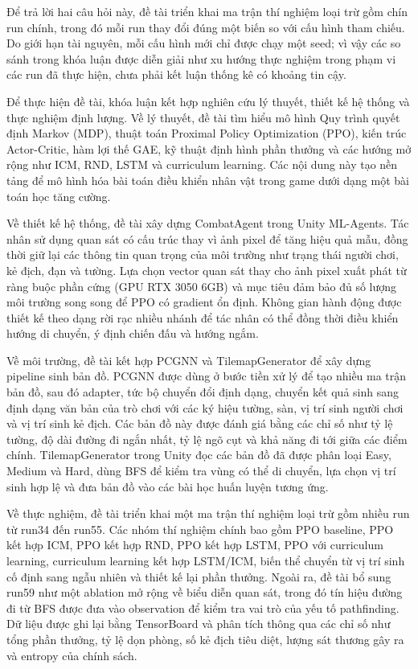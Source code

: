 Để trả lời hai câu hỏi này, đề tài triển khai ma trận thí nghiệm loại trừ gồm chín run chính, trong đó mỗi run thay đổi đúng một biến so với cấu hình tham chiếu. Do giới hạn tài nguyên, mỗi cấu hình mới chỉ được chạy một seed; vì vậy các so sánh trong khóa luận được diễn giải như xu hướng thực nghiệm trong phạm vi các run đã thực hiện, chưa phải kết luận thống kê có khoảng tin cậy.

\vspace{0.5cm}


Để thực hiện đề tài, khóa luận kết hợp nghiên cứu lý thuyết, thiết kế hệ thống và thực nghiệm định lượng. Về lý thuyết, đề tài tìm hiểu mô hình Quy trình quyết định Markov (MDP), thuật toán Proximal Policy Optimization (PPO), kiến trúc Actor-Critic, hàm lợi thế GAE, kỹ thuật định hình phần thưởng và các hướng mở rộng như ICM, RND, LSTM và curriculum learning. Các nội dung này tạo nền tảng để mô hình hóa bài toán điều khiển nhân vật trong game dưới dạng một bài toán học tăng cường.

Về thiết kế hệ thống, đề tài xây dựng CombatAgent trong Unity ML-Agents. Tác nhân sử dụng quan sát có cấu trúc thay vì ảnh pixel để tăng hiệu quả mẫu, đồng thời giữ lại các thông tin quan trọng của môi trường như trạng thái người chơi, kẻ địch, đạn và tường. Lựa chọn vector quan sát thay cho ảnh pixel xuất phát từ ràng buộc phần cứng (GPU RTX 3050 6GB) và mục tiêu đảm bảo đủ số lượng môi trường song song để PPO có gradient ổn định. Không gian hành động được thiết kế theo dạng rời rạc nhiều nhánh để tác nhân có thể đồng thời điều khiển hướng di chuyển, ý định chiến đấu và hướng ngắm.

Về môi trường, đề tài kết hợp PCGNN và TilemapGenerator để xây dựng pipeline sinh bản đồ. PCGNN được dùng ở bước tiền xử lý để tạo nhiều ma trận bản đồ, sau đó adapter, tức bộ chuyển đổi định dạng, chuyển kết quả sinh sang định dạng văn bản của trò chơi với các ký hiệu tường, sàn, vị trí sinh người chơi và vị trí sinh kẻ địch. Các bản đồ này được đánh giá bằng các chỉ số như tỷ lệ tường, độ dài đường đi ngắn nhất, tỷ lệ ngõ cụt và khả năng đi tới giữa các điểm chính. TilemapGenerator trong Unity đọc các bản đồ đã được phân loại Easy, Medium và Hard, dùng BFS để kiểm tra vùng có thể di chuyển, lựa chọn vị trí sinh hợp lệ và đưa bản đồ vào các bài học huấn luyện tương ứng.

Về thực nghiệm, đề tài triển khai một ma trận thí nghiệm loại trừ gồm nhiều run từ run34 đến run55. Các nhóm thí nghiệm chính bao gồm PPO baseline, PPO kết hợp ICM, PPO kết hợp RND, PPO kết hợp LSTM, PPO với curriculum learning, curriculum learning kết hợp LSTM/ICM, biến thể chuyển từ vị trí sinh cố định sang ngẫu nhiên và thiết kế lại phần thưởng. Ngoài ra, đề tài bổ sung run59 như một ablation mở rộng về biểu diễn quan sát, trong đó tín hiệu đường đi từ BFS được đưa vào observation để kiểm tra vai trò của yếu tố pathfinding. Dữ liệu được ghi lại bằng TensorBoard và phân tích thông qua các chỉ số như tổng phần thưởng, tỷ lệ dọn phòng, số kẻ địch tiêu diệt, lượng sát thương gây ra và entropy của chính sách.

